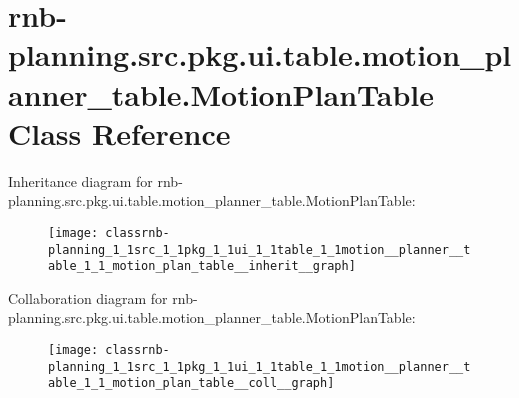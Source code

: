 \hypertarget{classrnb-planning_1_1src_1_1pkg_1_1ui_1_1table_1_1motion__planner__table_1_1_motion_plan_table}{}\section{rnb-\/planning.src.\+pkg.\+ui.\+table.\+motion\+\_\+planner\+\_\+table.\+Motion\+Plan\+Table Class Reference}
\label{classrnb-planning_1_1src_1_1pkg_1_1ui_1_1table_1_1motion__planner__table_1_1_motion_plan_table}


Inheritance diagram for rnb-\/planning.src.\+pkg.\+ui.\+table.\+motion\+\_\+planner\+\_\+table.\+Motion\+Plan\+Table\+:
\nopagebreak
\begin{figure}[H]
\begin{center}
\leavevmode
\texttt{[image: classrnb-planning\_1\_1src\_1\_1pkg\_1\_1ui\_1\_1table\_1\_1motion\_\_planner\_\_table\_1\_1\_motion\_plan\_table\_\_inherit\_\_graph]}
\end{center}
\end{figure}


Collaboration diagram for rnb-\/planning.src.\+pkg.\+ui.\+table.\+motion\+\_\+planner\+\_\+table.\+Motion\+Plan\+Table\+:
\nopagebreak
\begin{figure}[H]
\begin{center}
\leavevmode
\texttt{[image: classrnb-planning\_1\_1src\_1\_1pkg\_1\_1ui\_1\_1table\_1\_1motion\_\_planner\_\_table\_1\_1\_motion\_plan\_table\_\_coll\_\_graph]}
\end{center}
\end{figure}
